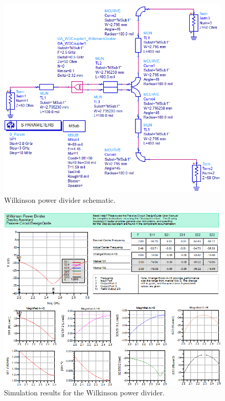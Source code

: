 \documentclass[conference]{IEEEtran}
\begin{document}
\begin{figure}[!htb]
\centering
\includegraphics[scale=0.4]{wilkinson-pics/wilkinson-schematic.png}
\caption{Wilkinson power divider schematic.}
\label{fig:WDSchematic}
\end{figure}

\begin{figure}[!htb]
\centering
\includegraphics[scale=0.4]{wilkinson-pics/wilkinson-simulation.png}
\caption{Simulation results for the Wilkinson power divider.}
\label{fig:WDSim}
\end{figure}
\end{document}
